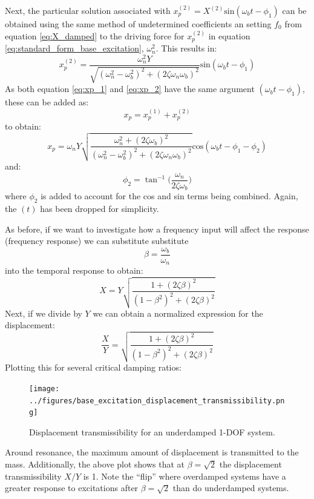 \documentclass[12pt,letter]{article}
\numberwithin{ex}{section} %
\numberwithin{re}{section} %
\numberwithin{pr}{section} %
\begin{document}
				Next, the particular solution associated with $x_p^{(2)} = X^{(2)} \text{sin}(\omega_b t - \phi_1)$ can be obtained using the same method of undetermined coefficients an setting $f_0$ from equation \ref{eq:X_damped} to the driving force for $x_p^{(2)}$ in equation  \ref{eq:standard_form_base_excitation}, $\omega_n^2$. This results in:
				\begin{equation}
					x_p^{(2)} = \frac{\omega_n^2 Y}{\sqrt{(\omega_n^2 - \omega_b^2)^2 +  (2\zeta \omega_n \omega_b)^2}}  \text{sin}(\omega_b t - \phi_1)
					\label{eq:xp_2}
				\end{equation}
				As both equation \ref{eq:xp_1} and \ref{eq:xp_2}  have the same argument $(\omega_b t - \phi_1)$, these can be added as:
				\begin{equation}
					x_p = 	x_p^{(1)} + x_p^{(2)}
				\end{equation}
				to obtain:
				\begin{equation}
					x_p = 	\omega_n Y   \sqrt{\frac{\omega_n^2 + (2 \zeta \omega_b)^2 }{(\omega_n^2 - \omega_b^2)^2 +  (2\zeta \omega_n \omega_b)^2} }  \text{cos}(\omega_bt - \phi_1 - \phi_2)
				\end{equation}
				and:
				\begin{equation}
					\phi_2 = \tan^{-1} \bigg(\frac{\omega_n}{2\zeta \omega_b}\bigg)
				\end{equation}
				where $\phi_2$ is added to account for the cos and sin terms being combined. Again, the $(t)$ has been dropped for simplicity. 
				
				As before, if we want to investigate how a frequency input will affect the response (frequency response) we can substitute substitute 
				\begin{equation}
				\beta=\frac{\omega_b}{\omega_n}
				\end{equation} 
				into the temporal response to obtain:
				\begin{equation}
				X = Y \sqrt{\frac{1+(2 \zeta \beta)^2}{(1-\beta^2)^2 + (2 \zeta \beta )^2}} 
				\end{equation} 
				Next, if we divide by $Y$ we can obtain a normalized expression for the displacement:
				\begin{equation}
				\frac{X}{Y} = \sqrt{\frac{1+(2 \zeta \beta)^2}{(1-\beta^2)^2 + (2 \zeta \beta )^2}} 
				\end{equation} 
				Plotting this for several critical damping ratios:
				\begin{figure}[H]
					\centering
					\texttt{[image: ../figures/base\_excitation\_displacement\_transmissibility.png]}
					\caption{Displacement transmissibility for an underdamped 1-DOF system.}
				\end{figure}
				Around resonance, the maximum amount of displacement is transmitted to the mass. Additionally,  the above plot shows that at $\beta=\sqrt{2}$ the displacement transmissibility $X/Y$ is 1. Note the ``flip'' where overdamped systems have a greater response to excitations after $\beta=\sqrt{2}$ than do underdamped systems.
\end{document}
